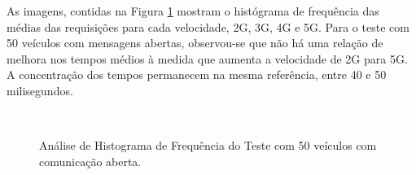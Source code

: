 \documentclass[
	12pt,				%
	oneside,			%
	a4paper,			%
	english,			%
	brazil				%
	]{abntex2ppgsi}
\begin{document}
As imagens, contidas na Figura \ref{fig:imgHistFreq50} mostram o histógrama de frequência das médias das requisições para cada velocidade, 2G, 3G, 4G e 5G. Para o teste com 50 veículos com mensagens abertas, observou-se que não há uma relação de melhora nos tempos médios à medida que aumenta a velocidade de 2G para 5G.  A concentração dos tempos permanecem na mesma referência, entre 40 e 50 milisegundos.

\begin{figure}[h!]
	\caption{Análise de Histograma de Frequência do Teste  com 50 veículos com comunicação aberta.}
	\centering
	\label{fig:imgHistFreq50}
	\\
\end{figure}
\end{document}
